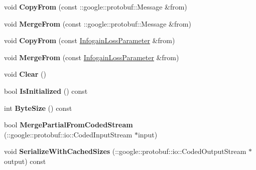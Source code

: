 \begin{DoxyCompactItemize}
void {\bfseries Copy\+From} (const \+::google\+::protobuf\+::\+Message \&from)
\item 
\mbox{\label{classcaffe_1_1_infogain_loss_parameter_a81f7b0dfd357d307d30cfb6d3fbe54af}} 
void {\bfseries Merge\+From} (const \+::google\+::protobuf\+::\+Message \&from)
\item 
\mbox{\label{classcaffe_1_1_infogain_loss_parameter_aba00e513de9f00c30ede536cd5fd711a}} 
void {\bfseries Copy\+From} (const \mbox{\hyperlink{classcaffe_1_1_infogain_loss_parameter}{Infogain\+Loss\+Parameter}} \&from)
\item 
\mbox{\label{classcaffe_1_1_infogain_loss_parameter_a629bbfda9afcf8019ce69d5d7e447617}} 
void {\bfseries Merge\+From} (const \mbox{\hyperlink{classcaffe_1_1_infogain_loss_parameter}{Infogain\+Loss\+Parameter}} \&from)
\item 
\mbox{\label{classcaffe_1_1_infogain_loss_parameter_a9c0bd214d4202577c018d6085a7d6ad0}} 
void {\bfseries Clear} ()
\item 
\mbox{\label{classcaffe_1_1_infogain_loss_parameter_ad31c2430a9dfa2213fadf65c76c067b4}} 
bool {\bfseries Is\+Initialized} () const
\item 
\mbox{\label{classcaffe_1_1_infogain_loss_parameter_a8a4a36a11ce7e32617e71316c2aa73d3}} 
int {\bfseries Byte\+Size} () const
\item 
\mbox{\label{classcaffe_1_1_infogain_loss_parameter_a4abddd5b02e4b8540346f79724f63b74}} 
bool {\bfseries Merge\+Partial\+From\+Coded\+Stream} (\+::google\+::protobuf\+::io\+::\+Coded\+Input\+Stream $\ast$input)
\item 
\mbox{\label{classcaffe_1_1_infogain_loss_parameter_aeee8ddb424dff7ff8a24fe8a2800ab05}} 
void {\bfseries Serialize\+With\+Cached\+Sizes} (\+::google\+::protobuf\+::io\+::\+Coded\+Output\+Stream $\ast$output) const
\item 
\mbox{\label{classcaffe_1_1_infogain_loss_parameter_aaf3f0fc7f953098a65fb11eb36a73ebe}} 

\end{DoxyCompactItemize}
